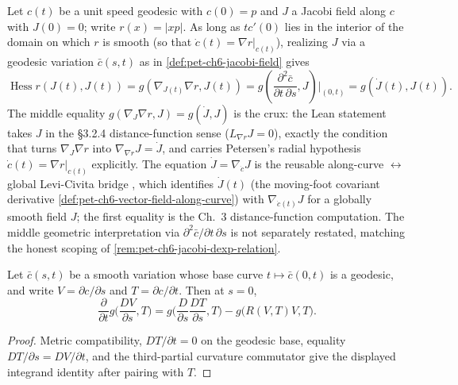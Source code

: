 \begin{remark}
  \label{rem:pet-ch6-jacobi-hessian-r}
  \leanok
  Let $c(t)$ be a unit speed geodesic with $c(0)=p$ and $J$ a Jacobi field
  along $c$ with $J(0)=0$; write $r(x)=|xp|$. As long as $tc'(0)$ lies in the
  interior of the domain on which $r$ is smooth (so that $\dot c(t)=\nabla
  r|_{c(t)}$), realizing $J$ via a geodesic variation $\bar c(s,t)$ as in
  \cref{def:pet-ch6-jacobi-field} gives
  \[
    \operatorname{Hess}r(J(t),J(t))=g(\nabla_{J(t)}\nabla r,J(t))
    =g\!\left(\frac{\partial^2\bar c}{\partial t\,\partial s},J\right)\Big|_{(0,t)}
    =g(\dot J(t),J(t)).
  \]
  The middle equality $g(\nabla_{J}\nabla r,J)=g(\dot J,J)$ is the crux: the
  Lean statement takes $J$ in the \S3.2.4 distance-function sense
  ($L_{\nabla r}J=0$), exactly the condition that turns
  $\nabla_{J}\nabla r$ into $\nabla_{\nabla r}J=\dot J$, and carries Petersen's
  radial hypothesis $\dot c(t)=\nabla r|_{c(t)}$ explicitly. The equation
  $\dot J=\nabla_{\dot c}J$ is the reusable along-curve $\leftrightarrow$ global
  Levi-Civita bridge , which
  identifies $\dot J(t)$ (the moving-foot covariant derivative
  \cref{def:pet-ch6-vector-field-along-curve}) with $\nabla_{\dot c(t)}J$ for a
  globally smooth field $J$; the first equality is the Ch.~3
  distance-function computation. The middle geometric interpretation via
  $\partial^2\bar c/\partial t\,\partial s$ is not separately restated, matching
  the honest scoping of \cref{rem:pet-ch6-jacobi-dexp-relation}.
\end{remark}

\begin{lemma}
  \label{lem:pet-ch6-second-variation-integrand}
  \leanok
  Let $\bar c(s,t)$ be a smooth variation whose base curve $t\mapsto\bar c(0,t)$ is
  a geodesic, and write $V=\partial c/\partial s$ and $T=\partial c/\partial t$.
  Then at $s=0$,
  \[
    \frac{\partial}{\partial t}g\Big(\frac{DV}{\partial s},T\Big)
      =g\Big(\frac{D}{\partial s}\frac{DT}{\partial s},T\Big)-g\big(R(V,T)V,T\big).
  \]
\end{lemma}
\begin{proof}
  \sketch
  Metric compatibility, \(DT/\partial t=0\) on the geodesic base, equality \(DT/\partial s=DV/\partial t\), and the third-partial curvature commutator give the displayed integrand identity after pairing with \(T\).
\end{proof}


